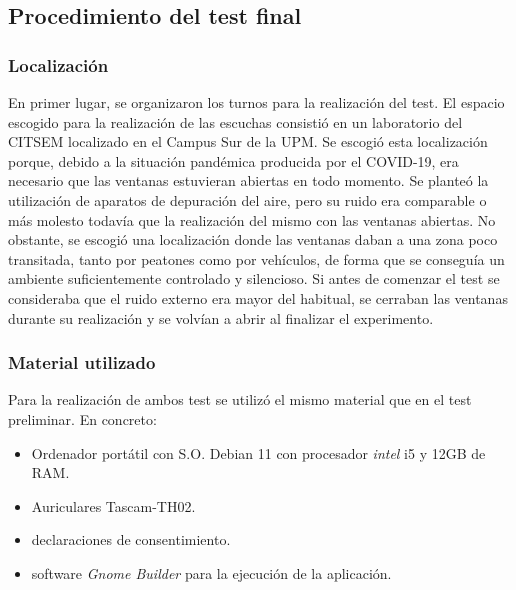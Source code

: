 \documentclass[11pt,a4paper,twoside]{book}
\begin{document}
            \subsection{Procedimiento del test final}
        
                \subsubsection*{Localización}
                    En primer lugar, se organizaron los turnos para la realización del test. El espacio escogido para la realización de las escuchas consistió en un laboratorio del CITSEM localizado en el Campus Sur de la UPM. Se escogió esta localización porque, debido a la situación pandémica producida por el COVID-19, era necesario que las ventanas estuvieran abiertas en todo momento. Se planteó la utilización de aparatos de depuración del aire, pero su ruido era comparable o más molesto todavía que la realización del mismo con las ventanas abiertas. No obstante, se escogió una localización donde las ventanas daban a una zona poco transitada, tanto por peatones como por vehículos, de forma que se conseguía un ambiente suficientemente controlado y silencioso. Si antes de comenzar el test se consideraba que el ruido externo era mayor del habitual, se cerraban las ventanas durante su realización y se volvían a abrir al finalizar el experimento.
            
                \subsubsection*{Material utilizado}
                    Para la realización de ambos test se utilizó el mismo material que en el test preliminar. En concreto:
                    \begin{itemize}
                        \item Ordenador portátil con S.O. Debian 11 con procesador \textit{intel} i5 y 12GB de RAM.
                        \item Auriculares Tascam-TH02.
                        \item declaraciones de consentimiento.
                        \item software \textit{Gnome Builder} para la ejecución de la aplicación.
                    \end{itemize}
                
\end{document}
